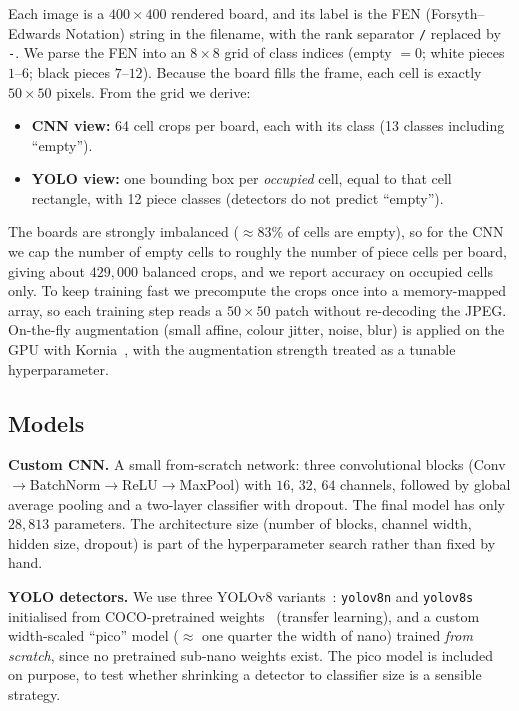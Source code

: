 \documentclass[10pt,twocolumn,a4paper]{article}
\begin{document}
	Each image is a $400\times400$ rendered board, and its label is the FEN (Forsyth--Edwards Notation) string in the filename, with the rank separator \texttt{/} replaced by \texttt{-}. We parse the FEN into an $8\times8$ grid of class indices (empty $=0$; white pieces $1$--$6$; black pieces $7$--$12$). Because the board fills the frame, each cell is exactly $50\times50$ pixels. From the grid we derive:
	\begin{itemize}
		\item \textbf{CNN view:} 64 cell crops per board, each with its class (13 classes including ``empty'').
		\item \textbf{YOLO view:} one bounding box per \emph{occupied} cell, equal to that cell rectangle, with 12 piece classes (detectors do not predict ``empty'').
	\end{itemize}
	The boards are strongly imbalanced ($\approx 83\%$ of cells are empty), so for the CNN we cap the number of empty cells to roughly the number of piece cells per board, giving about $429{,}000$ balanced crops, and we report accuracy on occupied cells only. To keep training fast we precompute the crops once into a memory-mapped array, so each training step reads a $50\times50$ patch without re-decoding the JPEG. On-the-fly augmentation (small affine, colour jitter, noise, blur) is applied on the GPU with Kornia~\cite{riba2020kornia}, with the augmentation strength treated as a tunable hyperparameter.

	\subsection{Models}

	\textbf{Custom CNN.} A small from-scratch network: three convolutional blocks (Conv$\to$BatchNorm$\to$ReLU$\to$MaxPool) with $16$, $32$, $64$ channels, followed by global average pooling and a two-layer classifier with dropout. The final model has only $28{,}813$ parameters. The architecture size (number of blocks, channel width, hidden size, dropout) is part of the hyperparameter search rather than fixed by hand.

	\textbf{YOLO detectors.} We use three YOLOv8 variants~\cite{jocher2023yolov8}: \texttt{yolov8n} and \texttt{yolov8s} initialised from COCO-pretrained weights~\cite{lin2014coco} (transfer learning), and a custom width-scaled ``pico'' model ($\approx$ one quarter the width of nano) trained \emph{from scratch}, since no pretrained sub-nano weights exist. The pico model is included on purpose, to test whether shrinking a detector to classifier size is a sensible strategy.
\end{document}
